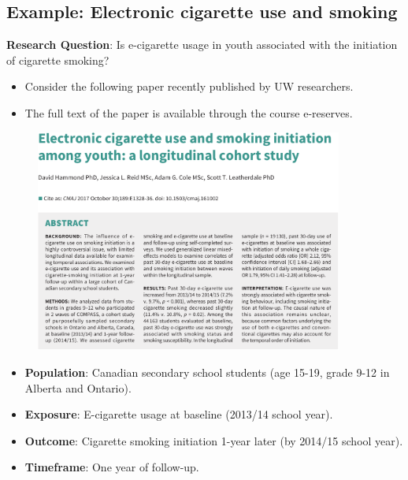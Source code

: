 \subsection*{Example: Electronic cigarette use and smoking}
\begin{Example}{}
    \textbf{Research Question}: Is e-cigarette usage in youth associated with the initiation of
    cigarette smoking?
\end{Example}
\begin{itemize}
    \item Consider the following paper recently published by UW researchers.
    \item The full text of the paper is available through the course e-reserves.
\end{itemize}
\begin{figure}[!htbp]
    \centering
    \includegraphics[width=0.9\textwidth]{first.pdf}
\end{figure}
\begin{itemize}
    \item \textbf{Population}: Canadian secondary school students (age 15-19, grade 9-12 in Alberta and Ontario).
    \item \textbf{Exposure}: E-cigarette usage at baseline (2013/14 school year).
    \item \textbf{Outcome}: Cigarette smoking initiation 1-year later (by 2014/15 school year).
    \item \textbf{Timeframe}: One year of follow-up.
\end{itemize}
